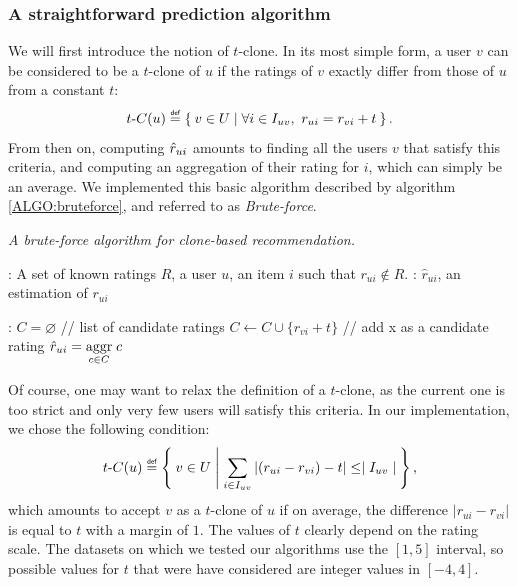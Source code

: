 \subsubsection{A straightforward prediction algorithm}
\label{STRAIGHTFORWARD}

We will first introduce the notion of $t$-clone. In its most simple form, a
user $v$ can be considered to be a $t$-clone of $u$ if the ratings of $v$
exactly differ from those of $u$ from a constant $t$:
$$
t\text{-}C(u) \eqdef \Set{v \in U | \forall i \in I_{uv},~ r_{ui} = r_{vi} + t}.
$$
From then on, computing $\hat{r}_{ui}$ amounts to finding all the users $v$ that
satisfy this criteria, and computing an aggregation of their rating for $i$,
which can simply be an average. We implemented this basic algorithm described
by algorithm \ref{ALGO:bruteforce}, and referred to as \textit{Brute-force}.

 \begin{algorithm}[!ht]
   \caption{\textit{A brute-force algorithm for clone-based recommendation.}}
       \label{ALGO:bruteforce}
       \begin{algorithmic}

      : A set of known ratings $R$, a user $u$, an item
      $i$ such that $r_{ui} \notin R$.
      : $\hat{r}_{ui}$, an estimation of $r_{ui}$

      :
      \STATE $C = \varnothing$ \quad \quad // list of candidate ratings
          \STATE $C \gets C \cup \{r_{vi} + t\}$ \quad // add x as a candidate rating
          \ENDIF
        \ENDFOR
	    \ENDFOR
    \STATE $\hat{r}_{ui} = \underset{c \in C}{\operatorname{aggr}}\; c$
\end{algorithmic}
\end{algorithm}

Of course, one may want to relax the definition of a $t$-clone, as the current
one is too strict and only very few users will satisfy this criteria. In our
implementation, we chose the following condition:
$$
t\text{-}C(u) \eqdef \Set{v \in U |  \sum_{i \in I_{uv}} |(r_{ui} - r_{vi}) -
t| \leq \mid I_{uv}\mid},$$
which amounts to accept $v$ as a $t$-clone of $u$ if on average, the
difference $|r_{ui} - r_{vi}|$ is equal to $t$ with a margin of $1$.
The values of $t$ clearly depend on the rating scale. The datasets on which we
tested our algorithms use the $[1, 5]$ interval, so possible values for $t$
that were have considered are integer values in $[-4, 4]$.

